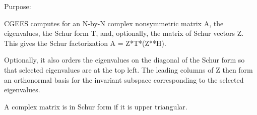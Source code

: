  \begin{DoxyParagraph}{Purpose\+: }
\begin{DoxyVerb} CGEES computes for an N-by-N complex nonsymmetric matrix A, the
 eigenvalues, the Schur form T, and, optionally, the matrix of Schur
 vectors Z.  This gives the Schur factorization A = Z*T*(Z**H).

 Optionally, it also orders the eigenvalues on the diagonal of the
 Schur form so that selected eigenvalues are at the top left.
 The leading columns of Z then form an orthonormal basis for the
 invariant subspace corresponding to the selected eigenvalues.

 A complex matrix is in Schur form if it is upper triangular.\end{DoxyVerb}
 
\end{DoxyParagraph}

